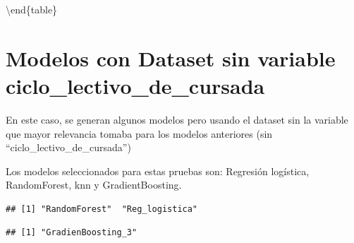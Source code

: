\documentclass[]{article}
\begin{document}
\textbackslash{}end\{table\}

\hypertarget{modelos-con-dataset-sin-variable-ciclo_lectivo_de_cursada}{%
\section{Modelos con Dataset sin variable
ciclo\_lectivo\_de\_cursada}\label{modelos-con-dataset-sin-variable-ciclo_lectivo_de_cursada}}

En este caso, se generan algunos modelos pero usando el dataset sin la
variable que mayor relevancia tomaba para los modelos anteriores (sin
``ciclo\_lectivo\_de\_cursada'')

Los modelos seleccionados para estas pruebas son: Regresión logística,
RandomForest, knn y GradientBoosting.

\begin{lstlisting}
## [1] "RandomForest"  "Reg_logistica"
\end{lstlisting}

\begin{lstlisting}
## [1] "GradienBoosting_3"
\end{lstlisting}
\end{document}
